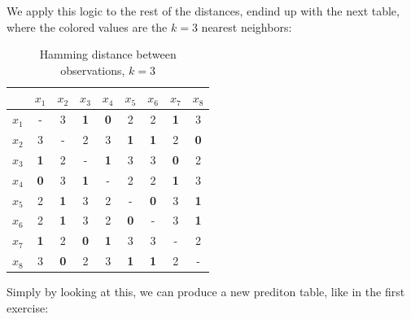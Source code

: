 \documentclass[12pt]{article}
\begin{document}
\begin{enumerate}[leftmargin=\labelsep]
    We apply this logic to the rest of the distances, endind up with the next table, where the colored values are the $k=3$ nearest neighbors:
    \vspace{5pt}
    \begin{table}[H]
        \begin{center}
            \begin{tabular}{c|cccccccc}
            & $x_1$ & $x_2$ & $x_3$ & $x_4$ & $x_5$ & $x_6$ & $x_7$ & $x_8$\\ 
            \hline
                $x_1$ & \-- & 3 & \textbf{\textcolor{codegreen}{1}} & \textbf{\textcolor{codegreen}{0}} & 2 & 2 & \textbf{\textcolor{codepink}{1}} & 3\\ 
                $x_2$ & 3 & \-- & 2 & 3 & \textbf{\textcolor{codepink}{1}} & \textbf{\textcolor{codepink}{1}} & 2 & \textbf{\textcolor{codepink}{0}}\\ 
                $x_3$ & \textbf{\textcolor{codegreen}{1}} & 2 & \-- & \textbf{\textcolor{codegreen}{1}} & 3 & 3 & \textbf{\textcolor{codepink}{0}} & 2\\ 
                $x_4$ & \textbf{\textcolor{codegreen}{0}} & 3 & \textbf{\textcolor{codegreen}{1}} & \-- & 2 & 2 & \textbf{\textcolor{codepink}{1}} & 3\\ 
                $x_5$ & 2 & \textbf{\textcolor{codegreen}{1}} & 3 & 2 & \-- & \textbf{\textcolor{codepink}{0}} & 3 & \textbf{\textcolor{codepink}{1}}\\ 
                $x_6$ & 2 & \textbf{\textcolor{codegreen}{1}} & 3 & 2 & \textbf{\textcolor{codepink}{0}} & \-- & 3 & \textbf{\textcolor{codepink}{1}}\\ 
                $x_7$ & \textbf{\textcolor{codegreen}{1}} & 2 & \textbf{\textcolor{codegreen}{0}} & \textbf{\textcolor{codegreen}{1}} & 3 & 3 & \-- & 2\\ 
                $x_8$ & 3 & \textbf{\textcolor{codegreen}{0}} & 2 & 3 & \textbf{\textcolor{codepink}{1}} & \textbf{\textcolor{codepink}{1}} & 2 & \-- \\ 
            \end{tabular}
            \caption{Hamming distance between observations, $k=3$}
        \end{center}
    \end{table}

    Simply by looking at this, we can produce a new prediton table, like in the first exercise:


\end{enumerate}
\end{document}
